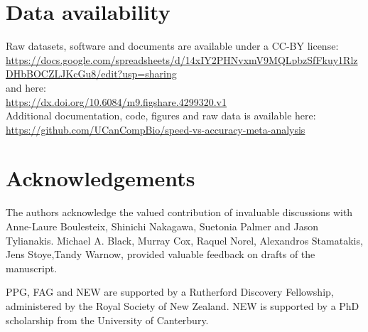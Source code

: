 \documentclass[fleqn,10pt]{SelfArx} %
\begin{document}
\section*{Data availability}
Raw datasets, software and documents are available under a CC-BY license:\\
\fussy
\url{https://docs.google.com/spreadsheets/d/14xIY2PHNvxmV9MQLpbzSfFkuy1RlzDHbBOCZLJKcGu8/edit?usp=sharing}\\
and here:\\
\fussy
\url{https://dx.doi.org/10.6084/m9.figshare.4299320.v1}\\
\sloppy
Additional documentation, code, figures and raw data is available here:\\
\fussy
\url{https://github.com/UCanCompBio/speed-vs-accuracy-meta-analysis}
\sloppy

\section*{Acknowledgements}
The authors acknowledge the valued contribution of invaluable discussions with Anne-Laure Boulesteix, Shinichi Nakagawa, Suetonia Palmer and Jason Tylianakis. Michael A. Black,  Murray Cox, Raquel Norel, Alexandros Stamatakis, Jens Stoye,Tandy Warnow, provided valuable feedback on drafts of the manuscript. 

PPG, FAG and NEW are supported by a Rutherford Discovery Fellowship,
administered by the Royal Society of New Zealand. NEW is supported by
a PhD scholarship from the University of Canterbury.



\end{document}

